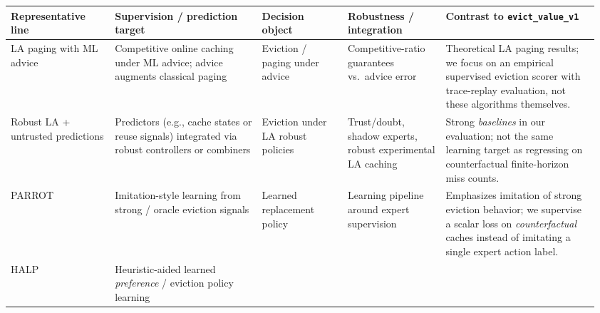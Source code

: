 \begin{minipage}{\linewidth}
\centering
\footnotesize
\setlength{\tabcolsep}{3pt}
\begin{tabular}{@{}>{\raggedright\arraybackslash}p{0.17\linewidth}>{\raggedright\arraybackslash}p{0.24\linewidth}>{\raggedright\arraybackslash}p{0.14\linewidth}>{\raggedright\arraybackslash}p{0.16\linewidth}>{\raggedright\arraybackslash}p{0.25\linewidth}@{}}
\toprule
\textbf{Representative line} &
\textbf{Supervision / prediction target} &
\textbf{Decision object} &
\textbf{Robustness / integration} &
\textbf{Contrast to \texttt{evict\_value\_v1}} \\
\midrule
LA paging with ML advice \citep{lykouris2018competitive,bansal2022weightedpaging} &
Competitive online caching under ML advice; advice augments classical paging &
Eviction / paging under advice &
Competitive-ratio guarantees vs.\ advice error &
Theoretical LA paging results; we focus on an empirical supervised eviction scorer with trace-replay evaluation, not these algorithms themselves. \\
\addlinespace[0.15em]
Robust LA + untrusted predictions \citep{antoniadis2020online,wei2020lacaching,chledowski2021robustlacaching} &
Predictors (e.g., cache states or reuse signals) integrated via robust controllers or combiners &
Eviction under LA robust policies &
Trust/doubt, shadow experts, robust experimental LA caching &
Strong \emph{baselines} in our evaluation; not the same learning target as regressing on counterfactual finite-horizon miss counts. \\
\addlinespace[0.15em]
PARROT \citep{liu2020parrot} &
Imitation-style learning from strong / oracle eviction signals &
Learned replacement policy &
Learning pipeline around expert supervision &
Emphasizes imitation of strong eviction behavior; we supervise a scalar loss on \emph{counterfactual} caches instead of imitating a single expert action label. \\
\addlinespace[0.15em]
HALP \citep{song2023halp} &
Heuristic-aided learned \emph{preference} / eviction policy learning &

\end{tabular}
\end{minipage}
